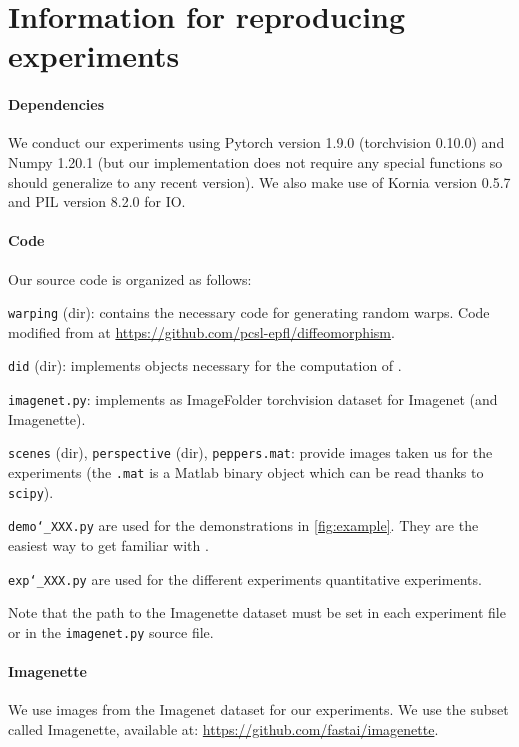 \section{Information for reproducing experiments}

\paragraph{Dependencies}
We conduct our experiments using Pytorch version 1.9.0 (torchvision 0.10.0) and Numpy 1.20.1 (but our implementation does not require any special functions so should generalize to any recent version). We also make use of Kornia version 0.5.7 and PIL version 8.2.0 for IO.

\paragraph{Code}

Our source code is organized as follows:

\bi
    \item \texttt{warping} (dir): contains the necessary code for generating random warps. Code modified from \citet{wyartdiffeo} at \href{https://github.com/pcsl-epfl/diffeomorphism}{https://github.com/pcsl-epfl/diffeomorphism}.
    \item \texttt{did} (dir): implements objects necessary for the computation of \Diffy.
    \item \texttt{imagenet.py}: implements as ImageFolder torchvision dataset for Imagenet (and Imagenette).
    \item \texttt{scenes} (dir), \texttt{perspective} (dir), \texttt{peppers.mat}: provide images taken us for the experiments (the \texttt{.mat} is a Matlab binary object which can be read thanks to \texttt{scipy}).
    \item \texttt{demo\char`_XXX.py} are used for the demonstrations in \cref{fig:example}. They are the easiest way to get familiar with \Diffy.
    \item \texttt{exp\char`_XXX.py} are used for the different experiments quantitative experiments.
\ei

Note that the path to the Imagenette dataset must be set in each experiment file or in the \texttt{imagenet.py} source file.

\paragraph{Imagenette} We use images from the Imagenet dataset for our experiments. We use the subset called Imagenette, available at: \href{https://github.com/fastai/imagenette}{https://github.com/fastai/imagenette}.

